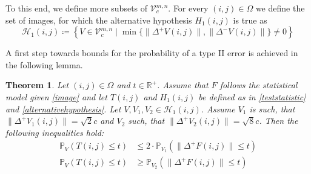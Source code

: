 \documentclass[a4paper,12pt]{article}
\newcommand{\norm}[1]{\lVert#1\rVert}
\theoremstyle{plain}
\newtheorem{theorem}{Theorem}[section]
\theoremstyle{definition}
\begin{document}
To this end, we define more subsets of $\mathcal{V}_c^{m, n}$. For every $(i, j) \in \Omega$ we define the set of images, for which the alternative hypothesis $H_1(i, j)$ is true as
\begin{equation}
	\mathcal{H}_1(i, j) \coloneqq \left\{ V \in \mathcal{V}_c^{m, n} \mid \min \{ \norm{\Delta^+ V(i, j)}, \norm{\Delta^- V(i, j)} \} \neq 0 \right\}
\end{equation}

A first step towards bounds for the probability of a type II error is achieved in the following lemma.

\begin{theorem}\label{thmtypeIIbounds}
	Let $(i, j) \in \Omega$ and $t \in \mathbb{R}^+$. Assume that $F$ follows the statistical model given \eqref{image} and let $T(i, j)$ and $H_1(i, j)$ be defined as in \eqref{teststatistic} and \eqref{alternativehypothesis}. Let $V, V_1, V_2 \in \mathcal{H}_1(i, j)$. Assume $V_1$ is such, that $\norm{\Delta^+ V_1(i, j)} = \sqrt{2} c$ and $V_2$ such, that $\norm{\Delta^+ V_2(i, j)} = \sqrt{8} c$. Then the following inequalities hold:
	\begin{align}
		\mathbb{P}_V( T(i, j) \leq t ) &\leq 2 \cdot \mathbb{P}_{V_1}( \norm{\Delta^+ F(i, j)} \leq t ) \label{eqtypeIIupperbound} \\
		\mathbb{P}_V( T(i, j) \leq t ) &\geq \mathbb{P}_{V_2}( \norm{\Delta^+ F(i, j)} \leq t ) \label{eqtypeIIlowerbound}
	\end{align}
\end{theorem}
\end{document}

